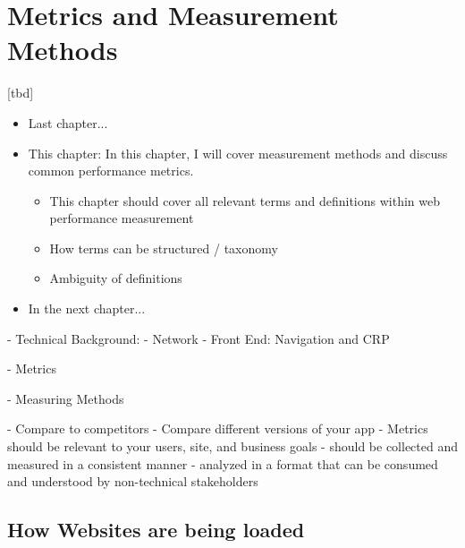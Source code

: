 \chapter{Metrics and Measurement Methods}

[tbd]

\begin{itemize}
	\item Last chapter...
	\item This chapter: In this chapter, I will cover measurement methods and discuss common performance metrics.
	\begin{itemize}
		\item This chapter should cover all relevant terms and definitions within web performance measurement
		\item How terms can be structured / taxonomy
		\item Ambiguity of definitions
	\end{itemize}
	\item In the next chapter...
\end{itemize}





- Technical Background:
	- Network
	- Front End: Navigation and CRP
	
- Metrics

- Measuring Methods



- Compare to competitors
- Compare different versions of your app
- Metrics should be relevant to your users, site, and business goals
- should be collected and measured in a consistent manner
- analyzed in a format that can be consumed and understood by non-technical stakeholders













\section{How Websites are being loaded}

